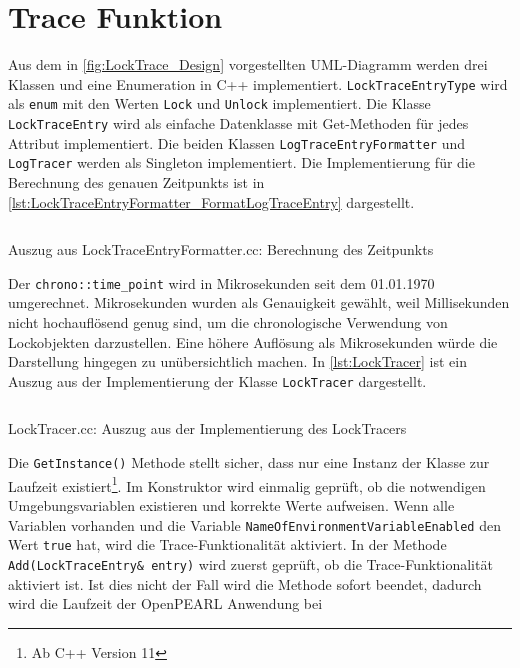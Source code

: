 \section{Trace Funktion}
\label{section:Implementierung:Trace Funktion}
Aus dem in \cref{fig:LockTrace_Design} vorgestellten UML-Diagramm werden drei
Klassen und eine Enumeration in C++ implementiert.
\texttt{Lock\-Trace\-Entry\-Type} wird als \texttt{enum} mit den Werten
\texttt{Lock} und \texttt{Unlock} implementiert. Die Klasse
\texttt{LockTraceEntry} wird als einfache Datenklasse mit Get-Methoden für jedes
Attribut implementiert. Die beiden Klassen \texttt{Log\-Trace\-Entry\-Formatter}
und \texttt{LogTracer} werden als Singleton implementiert. Die Implementierung
für die Berechnung des genauen Zeitpunkts ist in
\cref{lst:LockTraceEntryFormatter_FormatLogTraceEntry} dargestellt.
\begin{listing}[ht]
  \inputminted[frame=lines,linenos,firstline=31,lastline=33]{cpp}{./cpp/LockTraceEntryFormatter.cc}
  \caption{Auszug aus LockTraceEntryFormatter.cc: Berechnung des Zeitpunkts}
  \label{lst:LockTraceEntryFormatter_FormatLogTraceEntry}   
\end{listing}
Der \texttt{chrono::time\_point} wird in Mikrosekunden seit dem 01.01.1970
umgerechnet. Mikrosekunden wurden als Genauigkeit gewählt, weil Millisekunden
nicht hochauflösend genug sind, um die chronologische Verwendung von
Lockobjekten darzustellen. Eine höhere Auflösung als Mikrosekunden würde die
Darstellung hingegen zu unübersichtlich machen. In \cref{lst:LockTracer} ist ein
Auszug aus der Implementierung der Klasse \texttt{LockTracer} dargestellt.
\begin{listing}[ht]
  \inputminted[frame=lines,linenos,firstline=11,lastline=58]{cpp}{./cpp/LockTracer.cc}
  \caption{LockTracer.cc: Auszug aus der Implementierung des LockTracers}
  \label{lst:LockTracer}
\end{listing}
Die \texttt{GetInstance()} Methode stellt sicher, dass nur eine Instanz der
Klasse zur Laufzeit existiert\footnote{Ab C++ Version 11}. Im Konstruktor wird
einmalig geprüft, ob die notwendigen Umgebungsvariablen existieren und korrekte
Werte aufweisen. Wenn alle Variablen vorhanden und die Variable
\texttt{Name\-Of\-Environment\-Variable\-Enabled} den Wert \texttt{true} hat,
wird die Trace-Funktionalität aktiviert. In der Methode
\texttt{Add(Lock\-Trace\-Entry\& entry)} wird zuerst geprüft, ob die
Trace-Funktionalität aktiviert ist. Ist dies nicht der Fall wird die Methode
sofort beendet, dadurch wird die Laufzeit der OpenPEARL Anwendung bei
